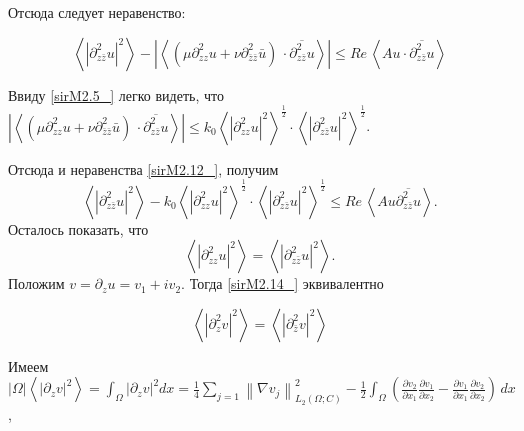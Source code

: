 Отсюда следует неравенство:

\begin{equation}
\label{sirM2.12_}
\left\langle \left|\partial _{z\bar{z}}^{2} u\right|^{2} \right\rangle -\left|\left\langle \left(\mu \partial _{zz}^{2} u+\nu \partial _{\bar{z}\bar{z}}^{2} \bar{u}\right)\, \cdot \overline{\partial _{z\bar{z}}^{2} u}\right\rangle \right|\le Re\, \left\langle Au\cdot \overline{\partial _{z\bar{z}}^{2} u}\right\rangle
\end{equation}

Ввиду  \eqref{sirM2.5_} легко видеть, что     $\left|\left\langle \left(\mu \partial _{zz}^{2} u+\nu \partial _{\bar{z}\bar{z}}^{2} \bar{u}\right)\, \cdot \overline{\partial _{z\bar{z}}^{2} u}\right\rangle \right|\le k_{0} \left\langle \left|\partial _{zz}^{2} u\right|^{2} \right\rangle ^{\frac{1}{2} } \cdot \left\langle \left|\partial _{z\bar{z}}^{2} u\right|^{2} \right\rangle ^{\frac{1}{2} } $.

Отсюда и неравенства \eqref{sirM2.12_}, получим
\begin{equation}
\left\langle \left|\partial _{z\bar{z}}^{2} u\right|^{2} \right\rangle -k_{0} \left\langle \left|\partial _{zz}^{2} u\right|^{2} \right\rangle ^{\frac{1}{2} } \cdot \left\langle \left|\partial _{z\bar{z}}^{2} u\right|^{2} \right\rangle ^{\frac{1}{2} } \le Re\, \left\langle Au\overline{\partial _{z\bar{z}}^{2} u}\right\rangle.
\label{sirM2.13_}
\end{equation}
Осталось показать, что
\begin{equation}
\left\langle \left|\partial _{zz}^{2} u\right|^{2} \right\rangle =\left\langle \left|\partial _{z\bar{z}}^{2} u\right|^{2} \right\rangle.
\label{sirM2.14_}
\end{equation}
 Положим $v=\partial _{z} u=v_{1} +iv_{2} $.  Тогда \eqref{sirM2.14_} эквивалентно

\begin{equation}
\label{sirM2.15_} \left\langle \left|\partial _{z}^{2} v\right|^{2} \right\rangle =\left\langle \left|\partial _{\bar{z}}^{2} v\right|^{2} \right\rangle
\end{equation}

 Имеем            $\left|\Omega \right|\left\langle \left|\partial _{z} v\right|^{2} \right\rangle =\int _{\Omega }\left|\partial _{z} v\right|^{2} dx=\frac{1}{4} \sum _{j=1}\left\| \nabla v_{j} \right\| _{L_{2} (\Omega ;C)}^{2}   -\frac{1}{2} \int _{\Omega }\left(\frac{\partial v_{2} }{\partial x_{1} } \frac{\partial v_{1} }{\partial x_{2} } -\frac{\partial v_{1} }{\partial x_{1} } \frac{\partial v_{2} }{\partial x_{2} } \right) \, dx$,

